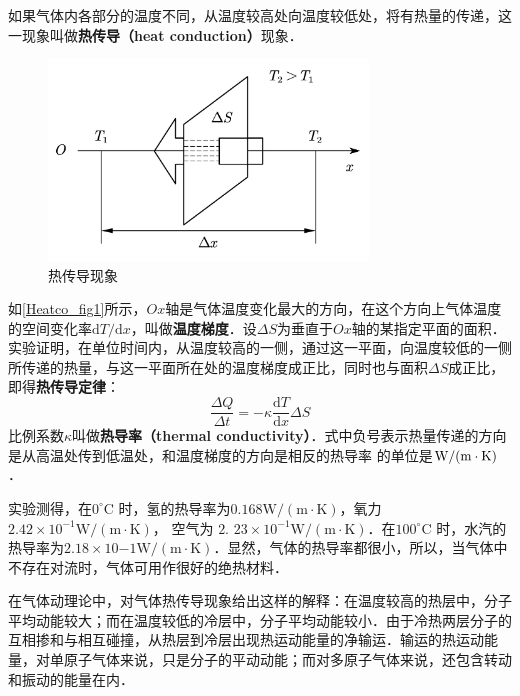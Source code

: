 
如果气体内各部分的温度不同，从温度较高处向温度较低处，将有热量的传递，这一现象叫做\textbf{热传导（heat conduction）}现象．

\begin{figure}[ht]
\centering
\includegraphics[width=8.5cm]{./figures/Heatco_1.pdf}
\caption{热传导现象} \label{Heatco_fig1}
\end{figure}

如\autoref{Heatco_fig1}所示，$Ox$轴是气体温度变化最大的方向，在这个方向上气体温度的空间变化率$\mathrm dT/\mathrm dx$，叫做\textbf{温度梯度}．设$\Delta S$为垂直于$Ox $轴的某指定平面的面积．实验证明，在单位时间内，从温度较高的一侧，通过这一平面，向温度较低的一侧所传递的热量，与这一平面所在处的温度梯度成正比，同时也与面积$\Delta S$成正比，即得\textbf{热传导定律}：
\begin{equation}
\frac{\Delta Q}{\Delta t}=-\kappa \frac{\mathrm{d} T}{\mathrm{d} x} \Delta S
\end{equation}
比例系数$\kappa$叫做\textbf{热导率（thermal conductivity）}．式中负号表示热量传递的方向是从高温处传到低温处，和温度梯度的方向是相反的热导率
的单位是$\rm W /(m \cdot K)$．

实验测得，在$0^{\circ} \mathrm{C}$ 时，氢的热导率为$0.168 \mathrm{W} /(\mathrm{m} \cdot \mathrm{K})$，氧力$2.42\times 10^{-1} \mathrm{W} /(\mathrm{m} \cdot \mathrm{K})$， 空气为$\text { 2. } 23 \times 10^{-1} \mathrm{W} /(\mathrm{m} \cdot \mathrm{K})$．在$100^{\circ} \mathrm{C}$ 时，水汽的热导率为$2. 18\times  10{-1}\mathrm{W} /(\mathrm{m} \cdot \mathrm{K})$．显然，气体的热导率都很小，所以，当气体中不存在对流时，气体可用作很好的绝热材料．

在气体动理论中，对气体热传导现象给出这样的解释：在温度较高的热层中，分子平均动能较大；而在温度较低的冷层中，分子平均动能较小．由于冷热两层分子的互相掺和与相互碰撞，从热层到冷层出现热运动能量的净输运．输运的热运动能量，对单原子气体来说，只是分子的平动动能；而对多原子气体来说，还包含转动和振动的能量在内．